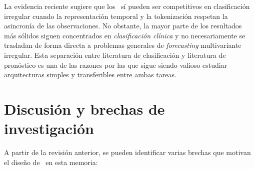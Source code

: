 La evidencia reciente sugiere que los \Transformers\ sí pueden ser competitivos en clasificación irregular cuando la representación temporal y la tokenización respetan la asincronía de las observaciones. No obstante, la mayor parte de los resultados más sólidos siguen concentrados en \textit{clasificación clínica} y no necesariamente se trasladan de forma directa a problemas generales de \textit{forecasting} multivariante irregular. Esta separación entre literatura de clasificación y literatura de pronóstico es una de las razones por las que sigue siendo valioso estudiar arquitecturas simples y transferibles entre ambas tareas.

\section{Discusión y brechas de investigación}
\label{sec:brechas-estado-arte}

A partir de la revisión anterior, se pueden identificar varias brechas que motivan el diseño de \CTTransformer\ en esta memoria:

